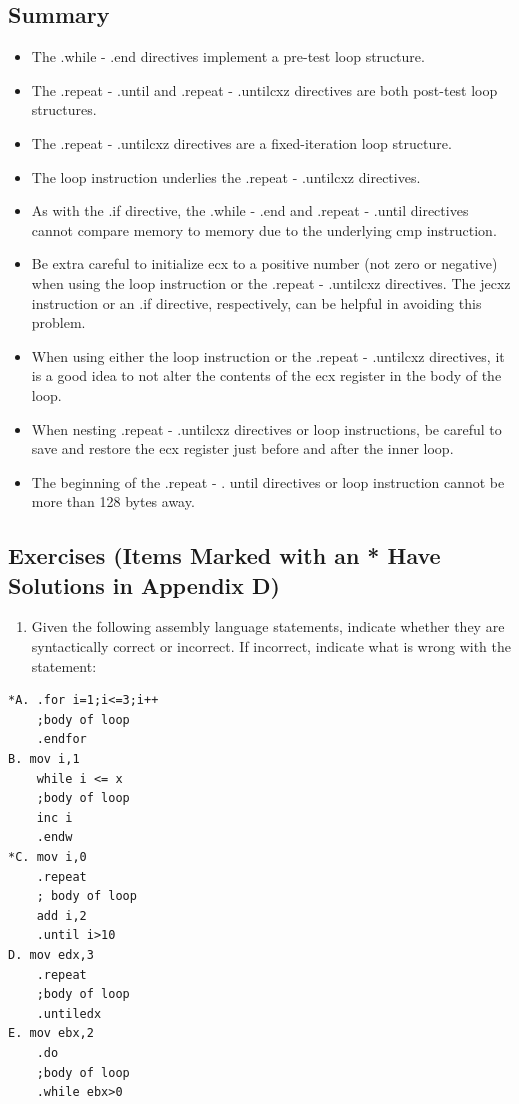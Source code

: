 \documentclass[10pt]{article}
\begin{document}
\subsection*{Summary}
\begin{itemize}
  \item The .while - .end directives implement a pre-test loop structure.
  \item The .repeat - .until and .repeat - .untilcxz directives are both post-test loop structures.
  \item The .repeat - .untilcxz directives are a fixed-iteration loop structure.
  \item The loop instruction underlies the .repeat - .untilcxz directives.
  \item As with the .if directive, the .while - .end and .repeat - .until directives cannot compare memory to memory due to the underlying cmp instruction.
  \item Be extra careful to initialize ecx to a positive number (not zero or negative) when using the loop instruction or the .repeat - .untilcxz directives. The jecxz instruction or an .if directive, respectively, can be helpful in avoiding this problem.
  \item When using either the loop instruction or the .repeat - .untilcxz directives, it is a good idea to not alter the contents of the ecx register in the body of the loop.
  \item When nesting .repeat - .untilcxz directives or loop instructions, be careful to save and restore the ecx register just before and after the inner loop.
  \item The beginning of the .repeat - . until directives or loop instruction cannot be more than 128 bytes away.
\end{itemize}

\subsection*{Exercises (Items Marked with an * Have Solutions in Appendix D)}
\begin{enumerate}
  \item Given the following assembly language statements, indicate whether they are syntactically correct or incorrect. If incorrect, indicate what is wrong with the statement:
\end{enumerate}

\begin{verbatim}
*A. .for i=1;i<=3;i++
    ;body of loop
    .endfor
B. mov i,1
    while i <= x
    ;body of loop
    inc i
    .endw
*C. mov i,0
    .repeat
    ; body of loop
    add i,2
    .until i>10
D. mov edx,3
    .repeat
    ;body of loop
    .untiledx
E. mov ebx,2
    .do
    ;body of loop
    .while ebx>0
\end{verbatim}
\end{document}
